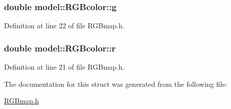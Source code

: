 \subsubsection[{g}]{\setlength{\rightskip}{0pt plus 5cm}double model\+::\+R\+G\+Bcolor\+::g}\label{structmodel_1_1_r_g_bcolor_af811d23f05960ced96a790b79f6de44b}


Definition at line 22 of file R\+G\+Bmap.\+h.

\hypertarget{structmodel_1_1_r_g_bcolor_a0d76acaf2238adbcc4c31e9a77cfa438}{}
\subsubsection[{r}]{\setlength{\rightskip}{0pt plus 5cm}double model\+::\+R\+G\+Bcolor\+::r}\label{structmodel_1_1_r_g_bcolor_a0d76acaf2238adbcc4c31e9a77cfa438}


Definition at line 21 of file R\+G\+Bmap.\+h.



The documentation for this struct was generated from the following file\+:\begin{DoxyCompactItemize}
\item 
\hyperlink{_r_g_bmap_8h}{R\+G\+Bmap.\+h}\end{DoxyCompactItemize}
